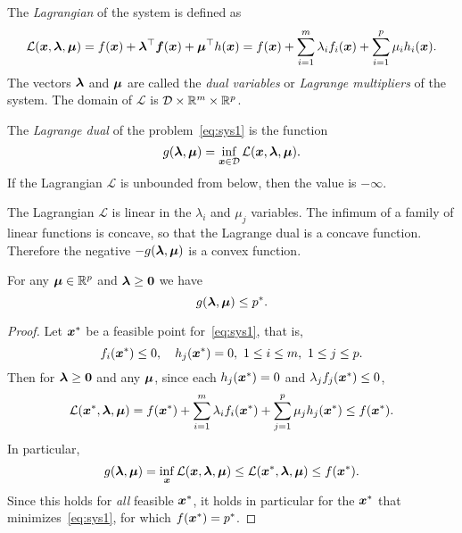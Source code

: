 The {\em Lagrangian} of the system is defined as
\begin{equation*}
 \mathcal{L}(\bm{x},\bm{\lambda},\bm{\mu}) = f(\bm{x})+\bm{\lambda}^{\top}\bm{f}(\bm{x})+\bm{\mu}^{\top}h(\bm{x}) = f(\bm{x}) +\sum_{i=1}^m \lambda_i f_i(\bm{x})+\sum_{i=1}^p \mu_i h_i(\bm{x}).
\end{equation*}
The vectors $\bm{\lambda}$ and $\bm{\mu}$ are called the {\em dual variables} or {\em Lagrange multipliers} of the system. The domain of $\mathcal{L}$ is $\mathcal{D}\times \mathbb{R}^m\times \mathbb{R}^{p}$. 

\begin{definition}
 The {\em Lagrange dual} of the problem~\eqref{eq:sys1} is the function
 \begin{equation*}
  g(\bm{\lambda},\bm{\mu}) = \inf_{\bm{x}\in \mathcal{D}} \mathcal{L}(\bm{x},\bm{\lambda},\bm{\mu}).
 \end{equation*}
If the Lagrangian $\mathcal{L}$ is unbounded from below, then the value is $-\infty$.
\end{definition}

The Lagrangian $\mathcal{L}$ is linear in the $\lambda_i$ and $\mu_j$ variables. The infimum of a family of linear functions is concave, so that the Lagrange dual is a concave function. Therefore the negative $-g(\bm{\lambda},\bm{\mu})$ is a convex function.

\begin{lemma}\label{le:lag1}
 For any $\bm{\mu}\in \mathbb{R}^{p}$ and $\bm{\lambda}\geq \bm{0}$ we have
 \begin{equation*}
 g(\bm{\lambda},\bm{\mu})\leq p^*.
 \end{equation*}
\end{lemma}

\begin{proof}
 Let $\bm{x}^*$ be a feasible point for~\eqref{eq:sys1}, that is,
 \begin{equation*}
  f_i(\vct{x}^*)\leq 0, \quad h_j(\vct{x}^*)=0,\ 1\leq i\leq m, \ 1\leq j\leq p.
 \end{equation*}
Then for $\bm{\lambda}\geq \bm{0}$ and any $\bm{\mu}$, since each $h_j(\bm{x}^*)=0$ and $\lambda_jf_j(\bm{x}^*)\leq 0$, 
\begin{equation*}
 \mathcal{L}(\bm{x}^*,\bm{\lambda},\bm{\mu}) = f(\bm{x}^*)+\sum_{i=1}^m \lambda_if_i(\bm{x}^*)+\sum_{j=1}^p \mu_j h_j(\bm{x}^*)\leq f(\bm{x}^*).
\end{equation*}
In particular,
\begin{equation*}
 g(\bm{\lambda},\bm{\mu}) = \inf_{\bm{x}} \mathcal{L}(\bm{x},\bm{\lambda},\bm{\mu}) \leq \mathcal{L}(\bm{x}^*,\bm{\lambda},\bm{\mu}) \leq f(\bm{x}^*).
\end{equation*}
Since this holds for {\em all} feasible $\bm{x}^*$, it holds in particular for the $\bm{x}^*$ that minimizes~\eqref{eq:sys1}, for which $f(\bm{x}^*)=p^*$. 
\end{proof}

